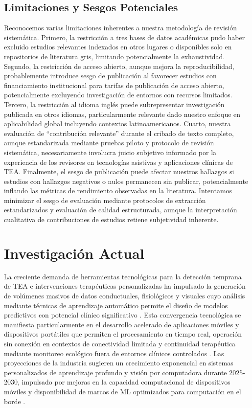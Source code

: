 \documentclass{ieeeaccess}
\begin{document}
	\subsection{Limitaciones y Sesgos Potenciales}
	Reconocemos varias limitaciones inherentes a nuestra metodología de revisión sistemática. Primero, la restricción a tres bases de datos académicas pudo haber excluido estudios relevantes indexados en otros lugares o disponibles solo en repositorios de literatura gris, limitando potencialmente la exhaustividad. Segundo, la restricción de acceso abierto, aunque mejora la reproducibilidad, probablemente introduce sesgo de publicación al favorecer estudios con financiamiento institucional para tarifas de publicación de acceso abierto, potencialmente excluyendo investigación de entornos con recursos limitados. Tercero, la restricción al idioma inglés puede subrepresentar investigación publicada en otros idiomas, particularmente relevante dado nuestro enfoque en aplicabilidad global incluyendo contextos latinoamericanos. Cuarto, nuestra evaluación de ``contribución relevante'' durante el cribado de texto completo, aunque estandarizada mediante pruebas piloto y protocolo de revisión sistemática, necesariamente involucra juicio subjetivo informado por la experiencia de los revisores en tecnologías asistivas y aplicaciones clínicas de TEA. Finalmente, el sesgo de publicación puede afectar nuestros hallazgos si estudios con hallazgos negativos o nulos permanecen sin publicar, potencialmente inflando las métricas de rendimiento observadas en la literatura. Intentamos minimizar el sesgo de evaluación mediante protocolos de extracción estandarizados y evaluación de calidad estructurada, aunque la interpretación cualitativa de contribuciones de estudios retiene subjetividad inherente.
	
	\section{Investigación Actual}
	\label{sec:investigacion}
	
	La creciente demanda de herramientas tecnológicas para la detección temprana de TEA e intervenciones terapéuticas personalizadas ha impulsado la generación de volúmenes masivos de datos conductuales, fisiológicos y visuales cuyo análisis mediante técnicas de aprendizaje automático permite el diseño de modelos predictivos con potencial clínico significativo \cite{b2}. Esta convergencia tecnológica se manifiesta particularmente en el desarrollo acelerado de aplicaciones móviles y dispositivos portátiles que permiten el procesamiento en tiempo real, operación sin conexión en contextos de conectividad limitada y continuidad terapéutica mediante monitoreo ecológico fuera de entornos clínicos controlados \cite{b12}. Las proyecciones de la industria sugieren un crecimiento exponencial en sistemas personalizados de aprendizaje profundo y visión por computadora durante 2025-2030, impulsado por mejoras en la capacidad computacional de dispositivos móviles y disponibilidad de marcos de ML optimizados para computación en el borde \cite{b13}.
	
\end{document}

